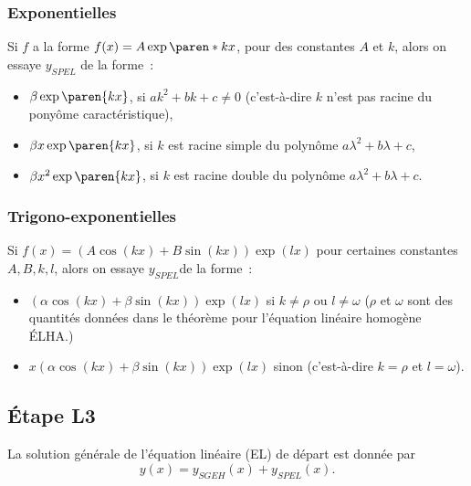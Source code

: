 \subsubsection{Exponentielles}
\begin{frame}
\label{sec:exponentielle}
Si \(f\) a la forme \(f(x) = A \exp{\paren*{kx}}\), pour des constantes \(A\) et \(k\), alors on essaye \(y_{SPEL}\) de la forme~:
\begin{itemize}
\item \(\beta \exp{\paren{kx}}\), si \(a k^{2} + b k + c \neq 0\) (c'est-à-dire \(k\) n'est pas racine du ponyôme caractéristique),
\item \(\beta x \exp{\paren{kx}}\), si \(k\) est racine simple du polynôme \(a\lambda^{2} + b \lambda + c\),
\item \(\beta x^{2} \exp{\paren{kx}}\), si \(k\) est racine double du polynôme \(a\lambda^{2} + b \lambda + c\).
\end{itemize}
\end{frame}

\subsubsection{Trigono-exponentielles}
\begin{frame}
\label{sec:trig-expon}
Si \(f(x) = (A \cos(kx) + B \sin(kx))\exp{(lx)}\) pour certaines constantes \(A,B,k,l\), alors on essaye \(y_{SPEL}\)de la forme~:
\begin{itemize}
\item \((\alpha \cos(kx) + \beta \sin(kx))\exp{(lx)}\) si \(k \neq \rho\) ou \(l \neq \omega\) (\(\rho\) et \(\omega\) sont des quantités données dans le théorème pour l'équation linéaire homogène ÉLHA.)
\item \(x(\alpha \cos(kx) + \beta \sin(kx))\exp{(lx)}\) sinon (c'est-à-dire \(k = \rho\) et \(l = \omega\)).
\end{itemize}
\end{frame}

\subsection{Étape L3}
\begin{frame}
La solution générale de l'équation linéaire (EL) de départ est donnée par
\begin{equation*}
  y(x) = y_{SGEH}(x) + y_{SPEL}(x).
\end{equation*}
\end{frame}

